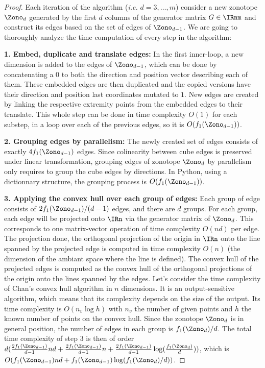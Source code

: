 \begin{proof}
    Each iteration of the algorithm (\emph{i.e.} $d=3,\dots, m$) consider a new zonotope $\Zono_d$ generated by the first $d$ columns of the generator matrix $G\in\IRnm$ and construct its edges based on the set of edges of $\Zono_{d-1}$. We are going to thoroughly analyze the time computation of every step in the algorithm:

    \textbf{1. Embed, duplicate and translate edges:} In the first inner-loop, a new dimension is added to the edges of $\Zono_{d-1}$, which can be done by concatenating a $0$ to both the direction and position vector describing each of them. These embedded edges are then duplicated and the copied versions have their direction and position last coordinates mutated to $1$. New edges are created by linking the respective extremity points from the embedded edges to their translate. This whole step can be done in time complexity $O(1)$ for each substep, in a loop over each of the previous edges, so it is $O(f_1({\Zono_{d-1}}))$.

    \textbf{2. Grouping edges by parallelism:} The newly created set of edges consists of exactly $4f_1(\Zono_{d-1})$ edges. Since colinearity between cube edges is preserved under linear transformation, grouping edges of zonotope $\Zono_d$ by parallelism only requires to group the cube edges by directions. In Python, using a dictionnary structure, the grouping process is $O(f_1(\Zono_{d-1}))$.
    
    \textbf{3. Applying the convex hull over each group of edges:} Each group of edge consists of $2f_1(\Zono_{d-1}) / (d-1)$ edges, and there are $d$ groups. For each group, each edge will be projected onto $\IRn$ via the generator matrix of $\Zono_d$. This corresponds to one matrix-vector operation of time complexity $O(nd)$ per edge. The projection done, the orthogonal projection of the origin in $\IRn$ onto the line spanned by the projected edge is computed in time complexity $O(n)$ (the dimension of the ambiant space where the line is defined). The convex hull of the projected edges is computed as the convex hull of the orthogonal projections of the origin onto the lines spanned by the edges. Let's consider the time complexity of Chan's convex hull algorithm in $n$ dimensions. It is an output-sensitive algorithm, which means that its complexity depends on the size of the output. Its time complexity is $O(n_v\log h)$ with $n_v$ the number of given points and $h$ the known number of points on the convex hull. Since the zonotope $\Zono_d$ is in general position,  the number of edges in each group is $f_1(\Zono_d) / d$. The total time complexity of step $3$ is then of order
    $d (\frac{2f_1(\Zono_{d-1})}{d-1}nd + \frac{2f_1(\Zono_{d-1})}{d-1}n + \frac{2f_1(\Zono_{d-1})}{d-1}\log(\frac{f_1(\Zono_{d})}{d}))$, which is
    $O(f_1(\Zono_{d-1}) nd +f_1(\Zono_{d-1})  \log(f_1(\Zono_{d}) / d))$.


\end{proof}
